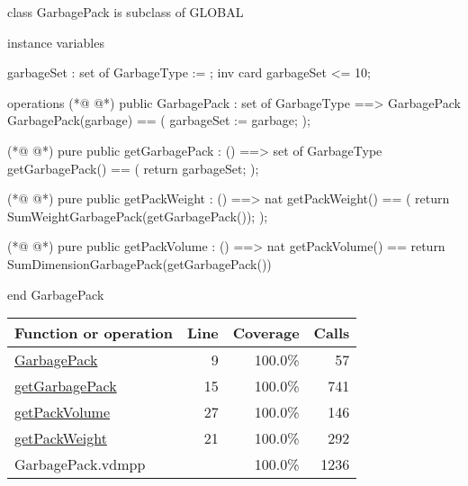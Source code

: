 \begin{vdmpp}[breaklines=true]
class GarbagePack is subclass of GLOBAL

instance variables

garbageSet : set of GarbageType := {};
inv card garbageSet <= 10;

operations
(*@
\label{GarbagePack:9}
@*)
public GarbagePack : set of GarbageType ==> GarbagePack
GarbagePack(garbage) == 
(
    garbageSet := garbage;
);

(*@
\label{getGarbagePack:15}
@*)
pure public getGarbagePack : () ==> set of GarbageType
getGarbagePack() == 
(
    return garbageSet;
);

(*@
\label{getPackWeight:21}
@*)
pure public getPackWeight : () ==> nat
getPackWeight() == 
(
    return SumWeightGarbagePack(getGarbagePack());
);

(*@
\label{getPackVolume:27}
@*)
pure public getPackVolume : () ==> nat
getPackVolume() ==
    return SumDimensionGarbagePack(getGarbagePack())

end GarbagePack
\end{vdmpp}
\bigskip
\begin{longtable}{|l|r|r|r|}
\hline
Function or operation & Line & Coverage & Calls \\
\hline
\hline
\hyperref[GarbagePack:9]{GarbagePack} & 9&100.0\% & 57 \\
\hline
\hyperref[getGarbagePack:15]{getGarbagePack} & 15&100.0\% & 741 \\
\hline
\hyperref[getPackVolume:27]{getPackVolume} & 27&100.0\% & 146 \\
\hline
\hyperref[getPackWeight:21]{getPackWeight} & 21&100.0\% & 292 \\
\hline
\hline
GarbagePack.vdmpp & & 100.0\% & 1236 \\
\hline
\end{longtable}

